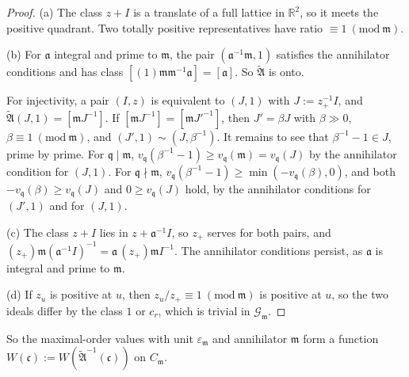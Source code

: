 \documentclass[11pt]{amsart}
\numberwithin{equation}{section}
\theoremstyle{plain}
\theoremstyle{definition}
\theoremstyle{remark}
\begin{document}
\begin{proof}
(a) The class \(z+I\) is a translate of a full lattice in \(\mathbb R^2\), so it meets the positive quadrant. Two totally positive representatives have ratio \(\equiv1\ (\mathrm{mod}\ \mathfrak m)\).

(b) For \(\mathfrak a\) integral and prime to \(\mathfrak m\), the pair \((\mathfrak a^{-1}\mathfrak m,1)\) satisfies the annihilator conditions and has class \([(1)\mathfrak m\mathfrak m^{-1}\mathfrak a]=[\mathfrak a]\). So \(\widetilde{\mathfrak A}\) is onto.

For injectivity, a pair \((I,z)\) is equivalent to \((J,1)\) with \(J:=z_+^{-1}I\), and \(\widetilde{\mathfrak A}(J,1)=[\mathfrak mJ^{-1}]\). If \([\mathfrak mJ^{-1}]=[\mathfrak mJ'^{-1}]\), then \(J'=\beta J\) with \(\beta\gg0\), \(\beta\equiv1\ (\mathrm{mod}\ \mathfrak m)\), and \((J',1)\sim(J,\beta^{-1})\). It remains to see that \(\beta^{-1}-1\in J\), prime by prime. For \(\mathfrak q\mid\mathfrak m\), \(v_{\mathfrak q}(\beta^{-1}-1)\ge v_{\mathfrak q}(\mathfrak m)=v_{\mathfrak q}(J)\) by the annihilator condition for \((J,1)\). For \(\mathfrak q\nmid\mathfrak m\), \(v_{\mathfrak q}(\beta^{-1}-1)\ge\min(-v_{\mathfrak q}(\beta),0)\), and both \(-v_{\mathfrak q}(\beta)\ge v_{\mathfrak q}(J)\) and \(0\ge v_{\mathfrak q}(J)\) hold, by the annihilator conditions for \((J',1)\) and for \((J,1)\).

(c) The class \(z+I\) lies in \(z+\mathfrak a^{-1}I\), so \(z_+\) serves for both pairs, and \((z_+)\mathfrak m(\mathfrak a^{-1}I)^{-1}=\mathfrak a\,(z_+)\mathfrak mI^{-1}\). The annihilator conditions persist, as \(\mathfrak a\) is integral and prime to \(\mathfrak m\).

(d) If \(z_u\) is positive at \(u\), then \(z_u/z_+\equiv1\ (\mathrm{mod}\ \mathfrak m)\) is positive at \(u\), so the two ideals differ by the class \(1\) or \(c_r\), which is trivial in \(\mathcal G_{\mathfrak m}\).
\end{proof}

So the maximal-order values with unit \(\varepsilon_{\mathfrak m}\) and annihilator \(\mathfrak m\) form a function \(W(\mathfrak c):=W(\widetilde{\mathfrak A}^{-1}(\mathfrak c))\) on \(C_{\mathfrak m}\).
\end{document}
